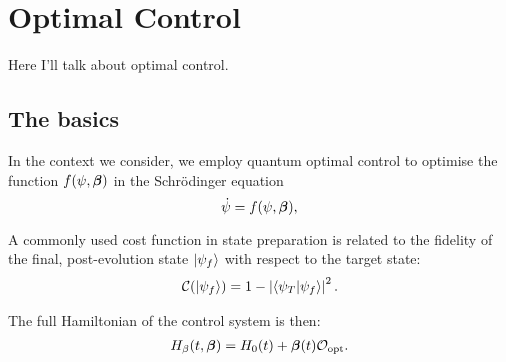 \chapter{Optimal Control}

Here I'll talk about optimal control.

\section{The basics}
In the context we consider,  we employ quantum optimal control to optimise the function $f(\psi,\boldsymbol{\beta})$ in the Schr\"odinger equation
\begin{equation}
\dot{\psi} = f(\psi,\boldsymbol{\beta}),
\label{eq:control_schroedinger}
\end{equation}

A commonly used cost function in state preparation is related  to the fidelity of the final, post-evolution state $\ket{\psi_f}$ with respect to the target state:
\begin{align} \label{eq:lossfunc}
    \mathcal{C}(\ket{\psi_f}) = 1 - \left|\braket{\psi_T}{\psi_f}\right|^2.
\end{align}

The full Hamiltonian of the control system is then:
\begin{align} \label{eq:h_optimal_control}
    H_{\beta}(t,\boldsymbol{\beta})  = H_0(t) + \boldsymbol{\beta}(t)\mathcal{O}_{\rm opt}.
\end{align}

    \section{}
    \section{}